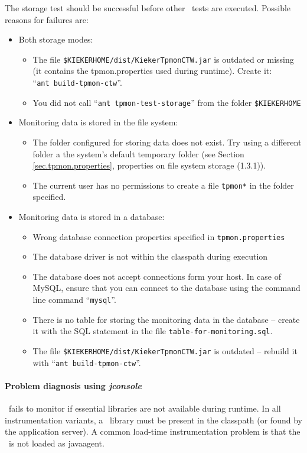 \documentclass[a4paper,12pt]{scrartcl}
\begin{document}
The storage test should be successful before other \tpmon\ tests are executed. Possible reasons for failures are:
\begin{itemize}
\item Both storage modes:
\begin{itemize}
 \item The file \texttt{\$KIEKERHOME/dist/KiekerTpmonCTW.jar} is outdated or missing (it contains the tpmon.properties used during runtime). Create it: \\ ``\texttt{ant build-tpmon-ctw}''.
\item You did not call ``\texttt{ant tpmon-test-storage}'' from the folder \texttt{\$KIEKERHOME}
\end{itemize}
\item Monitoring data is stored in the file system:
\begin{itemize}
 \item The folder configured for storing data does not exist. Try using a different folder a the system's default temporary folder (see Section \ref{sec.tpmon.properties}, properties on file system storage (1.3.1)).
\item The current user has no permissions to create a file \texttt{tpmon*} in the folder specified.
\end{itemize}
\item Monitoring data is stored in a database:
\begin{itemize}
\item Wrong database connection properties specified in \texttt{tpmon.properties}
\item The database driver is not within the classpath during execution
\item The database does not accept connections form your host. In case of MySQL, ensure that
you can connect to the database using the command line command ``\texttt{mysql}''.
\item There is no table for storing the monitoring data in the database -- create it with the SQL statement in the file
\texttt{table-for-monitoring.sql}.
\item The file \texttt{\$KIEKERHOME/dist/KiekerTpmonCTW.jar} is outdated -- rebuild it with ``\texttt{ant build-tpmon-ctw}''.
\end{itemize}
\end{itemize}

\paragraph{Problem diagnosis using \textit{jconsole}}
\tpmon\ fails to monitor if essential libraries are not available during runtime. In all instrumentation variants, a \tpmon\ library must be present in the classpath (or found by the application server). A common load-time instrumentation problem is that the \aspectjweaverjar\ is not loaded as javaagent.
\end{document}
